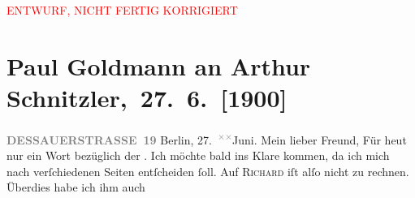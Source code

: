 
\begin{center}
            \textcolor{red}{ENTWURF, NICHT FERTIG KORRIGIERT}
                      \end{center}
            
         
         \newcommand{\erwaehntePersonen}{Personen: Richard Beer-Hofmann, Georg Hirschfeld, Leo Van-Jung}
         \newcommand{\erwaehnteInstitutionen}{Institutionen: Houghton Library}
         \newcommand{\erwaehnteOrte}{Orte: Alpen, Altaussee, Berlin, Dessauer Straße, Salzburg, Sekirn, Südtirol}
         \newcommand{\erwaehnteWerke}{Werke: Tagebuch}
               \section[ Paul Goldmann an Arthur Schnitzler, 27. 6. {[}1900{]}]{ Paul Goldmann an Arthur Schnitzler, 27. 6. {[}1900{]}}\nopagebreak{}\rehead{ }\begin{ledgroupsized}[t]{13cm}\normalsize\beginnumbering \toendnotes[C]{\smallbreak\pagebreak[2]} 
\toendnotes[C]{\smallbreak}\pstart{}{\pb}\textcolor{gray}{\textbf{DESSAUERSTRASSE 19}}\pend{}{\bigskip}\pstart
           \raggedleft{}Berlin, 27. \substVorne{}\textsuperscript{\textcolor{gray}{×}\-\textcolor{gray}{×}}\substDazwischen{}Ju\substHinten{}ni.\pend
           \pstart\center{}Mein lieber Freund,\pend\pstart
           Für heut nur ein Wort bezüglich der \label{K_L02922-2v}\label{K_L02922-2h}. Ich möchte bald ins Klare kommen, da ich mich nach verſchiedenen Seiten
               entſcheiden ſoll. Auf \textsc{Richard} iſt alſo nicht zu rechnen. Überdies habe ich \strikeout{\textcolor{gray}{an}} ihm auch \label{K_L02922-1v}
\end{ledgroupsized}
